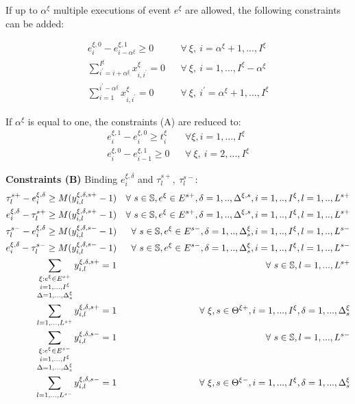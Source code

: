 \documentclass[]{interact}
\theoremstyle{plain}%
\theoremstyle{definition}
\theoremstyle{remark}
\begin{document}
If up to $\alpha^{\xi}$ multiple executions of event $e^{\xi}$ are allowed, the following constraints can be added:

\begin{eqnarray}
e^{\xi,0}_{i} - e^{\xi,1}_{i-\alpha^{\xi}} \ge 0 && \forall\ \xi,\ i=\alpha^{\xi}+1,...,I^{\xi} \\
\sum_{i^{'}=i+\alpha^{\xi}}^{I^{\xi}} x^{\xi}_{i,i^{'}}=0&& \forall\ \xi,\ i=1,...,I^{\xi}-\alpha^{\xi}\\
\sum_{i=1}^{i^{'}-\alpha^{\xi}} x^{\xi}_{i,i^{'}}=0&&\forall\ \xi,\ i^{'}=\alpha^{\xi}+1, ..., I^{\xi}
\end{eqnarray}

If $\alpha^{\xi}$ is equal to one, the constraints (A) are reduced to:
\begin{eqnarray}
e^{\xi,1}_{i} - e^{\xi,0}_{i} \ge t^{\xi}_{i} && \forall \xi, i=1,...,I^{\xi}\\
e^{\xi,0}_{i} - e^{\xi,1}_{i-1} \ge 0&& \forall\ \xi,\ i=2,...,I^{\xi} 
\end{eqnarray}

\textbf{Constraints (B)} Binding $e^{\xi,\delta}_i$ and $\tau^{s+}_l,\ \tau^{s-}_l$:
\begin{eqnarray}
\tau^{s+}_l - e^{\xi,\delta}_i \ge M(y^{\xi,\delta,s+}_{i,l}-1)&&\forall\ s\in \mathbb{S},e^{\xi}\in E^{s+},\delta=1,..,\Delta^{\xi,s},i=1,..,I^{\xi},l=1,..,L^{s+} \\
e^{\xi,\delta}_i - \tau^{s+}_l \ge M(y^{\xi,\delta,s+}_{i,l}-1)&&\forall\ s\in \mathbb{S},e^{\xi}\in E^{s+},\delta=1,..,\Delta^{\xi,s},i=1,..,I^{\xi},l=1,..,L^{s+}\\
\tau^{s-}_l - e^{\xi,\delta}_i \ge M(y^{\xi,\delta,s-}_{i,l}-1)&&\forall\ s\in \mathbb{S},e^{\xi}\in E^{s-},\delta=1,..,\Delta^{\xi}_s,i=1,..,I^{\xi},l=1,..,L^{s-}\\
e^{\xi,\delta}_i - \tau^{s-}_l \ge M(y^{\xi,\delta,s-}_{i,l}-1)&&\forall\ s\in \mathbb{S},e^{\xi}\in E^{s-},\delta=1,..,\Delta^{\xi}_s,i=1,..,I^{\xi},l=1,..,L^{s-}\\
\sum_{\begin{subarray}{c} \xi:e^{\xi}\in E^{s+} \\ i=1,...,I^{\xi}\\\Delta=1,..., \Delta^{\xi}_s\end{subarray}} y^{\xi,\delta,s+}_{i,l}=1&& \forall\ s\in \mathbb{S},l=1,...,L^{s+}\\
\sum_{l=1,...,L^{s+}} y^{\xi,\delta,s+}_{i,l}=1&&\forall\ \xi,s\in \Theta^{\xi+},i=1,...,I^{\xi},\delta=1,...,\Delta^{\xi}_{s}\\
\sum_{\begin{subarray}{c} \xi:e^{\xi}\in E^{s-} \\ i=1,...,I^{\xi}\\\Delta=1,..., \Delta^{\xi}_s\end{subarray}} y^{\xi,\delta,s-}_{i,l}=1&& \forall\ s\in \mathbb{S},l=1,...,L^{s-}\\
\sum_{l=1,...,L^{s-}} y^{\xi,\delta,s-}_{i,l}=1&&\forall\ \xi, s\in \Theta^{\xi-}, i=1,...,I^{\xi},\delta=1,...,\Delta^{\xi}_{s}\\
\end{eqnarray}
\end{document}
